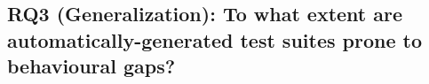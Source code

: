 


\subsection{RQ3 (Generalization): To what extent are auto\-matically-generated test suites prone to behavioural gaps?}
\label{sec:rq3}

